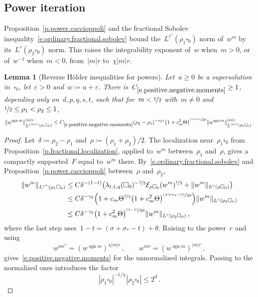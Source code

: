 \documentclass[11pt,letterpaper]{article}
\numberwithin{equation}{section}
\newtheorem{lemma}[theorem]{Lemma}
\theoremstyle{definition}
\newcommand{\eps}{\varepsilon}
\newcommand{\nf}{\nicefrac}
\newcommand{\cu}{\square}
\DeclarePairedDelimiter{\norm}{\lVert}{\rVert}
\newcommand{\Ener}{\mathcal E}
\begin{document}
\subsection{Power iteration}

Proposition~\ref{p.power.caccioppoli} and the fractional Sobolev inequality~\eqref{e.ordinary.fractional.sobolev} bound the~$L^{r^*}(\rho_1\cu_0)$ norm of~$w^m$ by its~$L^r(\rho_2\cu_0)$ norm. This raises the integrability exponent of~$w$ when~$m>0$, or of~$w^{-1}$ when~$m<0$, from~$|m|r$ to~$\chi|m|r$.

\begin{lemma}[Reverse H\"older inequalities for powers]
\label{l.positive.negative.moments}
Let~$u\geq0$ be a supersolution in~$\cu_0$, let~$\eps>0$ and~$w\coloneqq u+\eps$. There is~$C_{\eqref{e.positive.negative.moments}}\geq1$, depending only on~$d,p,q,s,t$, such that for~$m<\nf12$ with~$m\neq0$ and~$\nf12\leq\rho_1<\rho_2\leq1$,
\begin{equation}
	\norm{w^{\operatorname{sgn}m}}_{\underline L^{\chi|m|r}(\rho_1\cu_0)}^{|m|r}\leq C_{\eqref{e.positive.negative.moments}}(\rho_2-\rho_1)^{-\gamma_5r}\bigl(1+c_m^2\Theta\bigr)^{\nf{(1-t)r}{2\theta}}\norm{w^{\operatorname{sgn}m}}_{\underline L^{|m|r}(\rho_2\cu_0)}^{|m|r}\,.
	\label{e.positive.negative.moments}
\end{equation}
\end{lemma}

\begin{proof}
Let~$\delta\coloneqq\rho_2-\rho_1$ and~$\rho\coloneqq(\rho_1+\rho_2)/2$. The localization near~$\rho_1\overline{\cu}_0$ from Proposition~\ref{p.fractional.localization}, applied to~$w^m$ between~$\rho_1$ and~$\rho$, gives a compactly supported~$F$ equal to~$w^m$ there. By~\eqref{e.ordinary.fractional.sobolev} and Proposition~\ref{p.power.caccioppoli} between~$\rho$ and~$\rho_2$,
\begin{align*}
	\norm{w^m}_{L^{r^*}(\rho_1\cu_0)}&\leq C\delta^{-(1-t)}\bigl(\lambda_{t,1,q}(\cu_0)^{-\nf12}\Ener_{\rho\cu_0}(w^m)^{\nf12}+\norm{w^m}_{L^r(\rho\cu_0)}\bigr)\\
	&\leq C\delta^{-\gamma_5}\Bigl(1+c_m\Theta^{\nf12}\bigl(1+c_m^2\Theta\bigr)^{\nf{(\sigma+\sigma_*-t)}{2\theta}}\Bigr)\norm{w^m}_{L^r(\rho_2\cu_0)}\\
	&\leq C\delta^{-\gamma_5}\bigl(1+c_m^2\Theta\bigr)^{\nf{(1-t)}{2\theta}}\norm{w^m}_{L^r(\rho_2\cu_0)}\,,
\end{align*}
where the last step uses~$1-t=(\sigma+\sigma_*-t)+\theta$. Raising to the power~$r$ and using
\begin{equation*}
	w^{mr^*}=(w^{\operatorname{sgn}m})^{\chi|m|r}\,,\qquad w^{mr}=(w^{\operatorname{sgn}m})^{|m|r}\,,
\end{equation*}
gives~\eqref{e.positive.negative.moments} for the unnormalized integrals. Passing to the normalized ones introduces the factor
\begin{equation*}
	|\rho_1\cu_0|^{-1/\chi}|\rho_2\cu_0|\leq2^d\,.
\end{equation*}
\end{proof}
\end{document}
